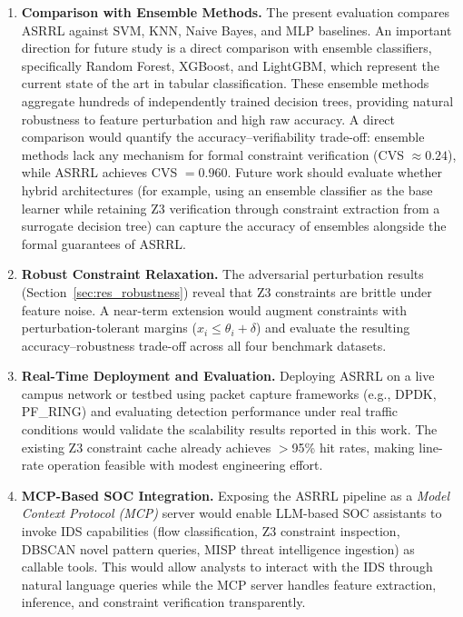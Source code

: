 \documentclass[12pt, letterpaper, oneside]{report}
\newcommand{\ASRRL}{\textsc{ASRRL}}
\begin{document}
\begin{enumerate}
    \item \textbf{Comparison with Ensemble Methods.} The present evaluation compares \ASRRL{} against SVM, KNN, Naive Bayes, and MLP baselines. An important direction for future study is a direct comparison with ensemble classifiers, specifically Random Forest, XGBoost, and LightGBM, which represent the current state of the art in tabular classification. These ensemble methods aggregate hundreds of independently trained decision trees, providing natural robustness to feature perturbation and high raw accuracy. A direct comparison would quantify the accuracy--verifiability trade-off: ensemble methods lack any mechanism for formal constraint verification (CVS $\approx 0.24$), while \ASRRL{} achieves CVS $= 0.960$. Future work should evaluate whether hybrid architectures (for example, using an ensemble classifier as the base learner while retaining Z3 verification through constraint extraction from a surrogate decision tree) can capture the accuracy of ensembles alongside the formal guarantees of \ASRRL{}.

    \item \textbf{Robust Constraint Relaxation.} The adversarial perturbation results (Section~\ref{sec:res_robustness}) reveal that Z3 constraints are brittle under feature noise. A near-term extension would augment constraints with perturbation-tolerant margins ($x_i \leq \theta_i + \delta$) and evaluate the resulting accuracy--robustness trade-off across all four benchmark datasets.

    \item \textbf{Real-Time Deployment and Evaluation.} Deploying \ASRRL{} on a live campus network or testbed using packet capture frameworks (e.g., DPDK, PF\_RING) and evaluating detection performance under real traffic conditions would validate the scalability results reported in this work. The existing Z3 constraint cache already achieves $>$95\% hit rates, making line-rate operation feasible with modest engineering effort.

    \item \textbf{MCP-Based SOC Integration.} Exposing the \ASRRL{} pipeline as a \emph{Model Context Protocol (MCP)} server would enable LLM-based SOC assistants to invoke IDS capabilities (flow classification, Z3 constraint inspection, DBSCAN novel pattern queries, MISP threat intelligence ingestion) as callable tools. This would allow analysts to interact with the IDS through natural language queries while the MCP server handles feature extraction, inference, and constraint verification transparently.
\end{enumerate}
\end{document}
